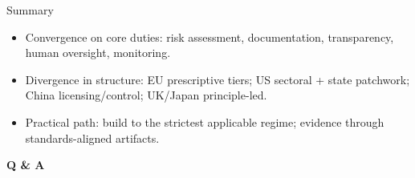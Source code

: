 \documentclass[aspectratio=169]{beamer}
\begin{document}
\begin{frame}{Summary}
\begin{itemize}
  \item Convergence on core duties: risk assessment, documentation, transparency, human oversight, monitoring.
  \item Divergence in structure: EU prescriptive tiers; US sectoral + state patchwork; China licensing/control; UK/Japan principle-led.
  \item Practical path: build to the strictest applicable regime; evidence through standards-aligned artifacts.
\end{itemize}
\end{frame}

\begin{frame}[plain]
\centering
\Huge \textbf{Q \& A}
\end{frame}
\end{document}
